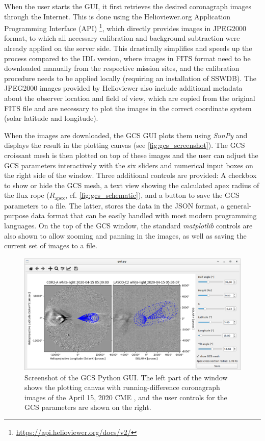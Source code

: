 When the user starts the \ac{GUI}, it first retrieves the desired coronagraph images through the Internet. This is done using the Helioviewer.org Application Programming Interface (API) \footnote{\url{https://api.helioviewer.org/docs/v2/}}, which directly provides images in JPEG2000 format, to which all necessary calibration and background subtraction were already applied on the server side. This drastically simplifies and speeds up the process compared to the \ac{IDL} version, where images in FITS format need to be downloaded manually from the respective mission sites, and the calibration procedure needs to be applied locally (requiring an installation of SSWDB). The JPEG2000 images provided by Helioviewer also include additional metadata about the observer location and field of view, which are copied from the original FITS file and are necessary to plot the images in the correct coordinate system (solar latitude and longitude).

When the images are downloaded, the \ac{GCS} \ac{GUI} plots them using \textit{SunPy} and displays the result in the plotting canvas (see \autoref{fig:gcs_screenshot}). The \ac{GCS} croissant mesh is then plotted on top of these images and the user can adjust the \ac{GCS} parameters interactively with the six sliders and numerical input boxes on the right side of the window. Three additional controls are provided: A checkbox to show or hide the \ac{GCS} mesh, a text view showing the calculated apex radius of the flux rope ($R_\text{apex}$, cf. \autoref{fig:gcs_schematic}), and a button to save the \ac{GCS} parameters to a file. The latter, stores the data in the \ac{JSON} format, a general-purpose data format that can be easily handled with most modern programming languages. On the top of the \ac{GCS} window, the standard \textit{matplotlib} controls are also shown to allow zooming and panning in the images, as well as saving the current set of images to a file.

\begin{figure}
	\centering
	\includegraphics[width=\textwidth]{images/gcs_screenshot.png}
	\caption[Screenshot of the \ac{GCS} Python \ac{GUI}]{Screenshot of the \ac{GCS} Python \ac{GUI}. The left part of the window shows the plotting canvas with running-difference coronagraph images of the April 15, 2020 \ac{CME} \citep[see][]{Forstner-2021-SolO}, and the user controls for the \ac{GCS} parameters are shown on the right.}
	\label{fig:gcs_screenshot}
\end{figure}

